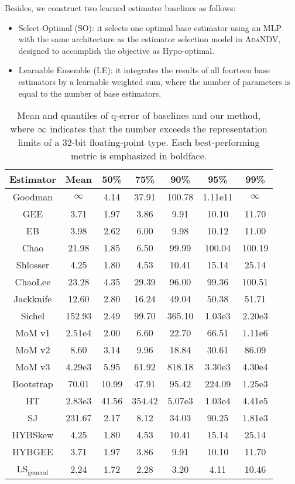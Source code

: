 Besides, we construct two learned estimator baselines as follows:

\begin{itemize}[leftmargin=10pt]
\item Select-Optimal (SO): it selects one optimal base estimator using an MLP with the same architecture as the estimator selection model in \textsc{AdaNDV}, designed to accomplish the objective as Hypo-optimal.
\item Learnable Ensemble (LE): it integrates the results of all fourteen base estimators by a learnable weighted sum, where the number of parameters is equal to the number of base estimators.
\end{itemize}




\begin{table}[]
    \centering
    \caption{Mean and quantiles of q-error of baselines and our method, where $\infty$ indicates that the number exceeds the representation limits of a 32-bit floating-point type. Each best-performing metric is emphasized in boldface.}
    \begin{tabular}{ccccccc}
\toprule
        Estimator& Mean & 50\% & 75\%& 90\% & 95\% & 99\% \\
\midrule
        Goodman& $\infty$ &4.14 & 37.91& 100.78&1.11e11 & $\infty$  \\
        GEE  &3.71  &1.97  &3.86  &9.91  &10.10  &11.70\\
        EB & 3.98 & 2.62 & 6.00 & 9.98 & 10.12 & 11.00 \\
        Chao & 21.98 & 1.85 & 6.50 & 99.99 & 100.04 & 100.19 \\
        Shlosser & 4.25 & 1.80 & 4.53 & 10.41 & 15.14 & 25.14\\
        ChaoLee &   23.28 & 4.35 & 29.39 & 96.00 & 99.36 & 100.51 \\
        Jackknife & 12.60 & 2.80 & 16.24 & 49.04 & 50.38 & 51.71  \\
        Sichel & 152.93 & 2.49 & 99.70 & 365.10 & 1.03e3 & 2.20e3 \\
        MoM v1 & 2.51e4 & 2.00 & 6.60 & 22.70 & 66.51 & 1.11e6 \\
        MoM v2 & 8.60 & 3.14 & 9.96 & 18.84 & 30.61 & 86.09 \\
        MoM v3 & 4.29e3 & 5.95 & 61.92 & 818.18 & 3.30e3 & 4.30e4 \\
        Bootstrap &  70.01 & 10.99 & 47.91 &95.42 &224.09& 1.25e3 \\
        HT & 2.83e3& 41.56 & 354.42 & 5.07e3 & 1.03e4 & 4.41e5 \\
        SJ & 231.67 & 2.17 & 8.12 & 34.03 & 90.25 & 1.81e3\\
\midrule
        HYBSkew & 4.25 & 1.80 & 4.53 & 10.41 & 15.14 & 25.14\\
        HYBGEE & 3.71 & 1.97 & 3.86 & 9.91 & 10.10 & 11.70\\
\midrule
    LS$_{\mathrm{general}}$ & 2.24 & 1.72 & 2.28 & 3.20 & 4.11 & 10.46 \\


\end{tabular}
\end{table}
